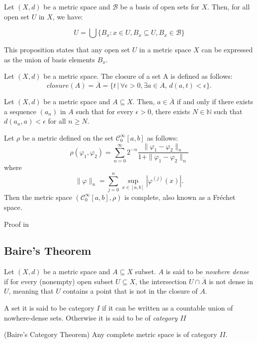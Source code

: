 \documentclass[../main.tex]{subfiles}
\begin{document}
\begin{propo}
Let $(X, d)$ be a metric space and $\mathcal{B}$ be a basis of open sets for $X$. Then, for all open set $U$ in $X$, we have:

$$U = \bigcup \{B_x : x \in U, B_x \subseteq U, B_x \in \mathcal{B}\}$$

This proposition states that any open set $U$ in a metric space $X$ can be expressed as the union of basis elements $B_x$.
\end{propo}


\begin{definition}Let $(X, d)$ be a metric space. The closure of a set A is defined as follows:
	$$closure(A) = \overline{A}=\{t \, |  \, \forall \epsilon> 0, \exists a \in A, \, d(a, t) < \epsilon\}.$$
\end{definition}

\begin{propo} \label{prop:23} Let $(X, d)$ be a metric space and $A \subseteq X$. Then, $a \in \overline{A}$ if and only if there exists a sequence $(a_n)$ in $A$ such that for every $\epsilon > 0$, there exists $N \in \mathbb{N}$ such that $d(a_n, a) < \epsilon$ for all $n \geq N$.
\end{propo}

\begin{propo} \label{prop:frech}
	Let $\rho$ be a metric defined on the set $\mathcal{C}^\infty_0[a,b]$ as follows:
	$$\rho(\varphi_1,\varphi_2) = \sum_{n=0}^\infty 2^{-n}  \frac{\|\varphi_1 -\varphi_2\|_n}{1+\|\varphi_1 -\varphi_2\|_n}$$ where $$\|\varphi\|_n= \sum_{j=0}^n \sup_{x\in [a,b]} | \varphi^{(j)}(x)|. $$  Then the metric space $(\mathcal{C}^\infty_0[a,b],\rho)$  is complete, also known as a Fréchet space.
\end{propo}

\noindent Proof in \cite{196785}


\subsection{Baire's Theorem}

\begin{definition} Let $(X,d)$ be a metric space and $A\subseteq X$ subset. $A$ is said to be \emph{nowhere dense} if for every (nonempty) open subset $U\subseteq X$, the intersection $U\cap\overline{A}$ is not dense in $U$, meaning that $U$ contains a point that is not in the closure of $A$.
\end{definition}

\begin{definition}
	A set it is said to be category $I$ if it can be written as a countable union of nowhere-dense sets. Otherwise it is said to be of \emph{category $II$}
\end{definition}
\begin{theorem} (Baire's Category Theorem) \label{baire}
	Any complete metric space is of category $II$.
\end{theorem}
\end{document}
